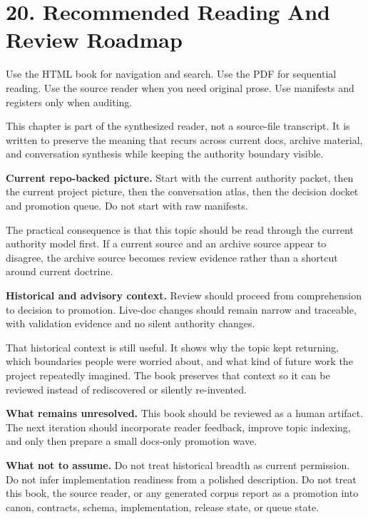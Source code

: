 \documentclass[10.5pt,a4paper,openany]{book}
\begin{document}
\section{20. Recommended Reading And Review Roadmap}

Use the HTML book for navigation and search.\allowbreak{} Use the PDF for sequential reading.\allowbreak{} Use the source reader when you need original prose.\allowbreak{} Use manifests and registers only when auditing.\allowbreak{}


This chapter is part of the synthesized reader, not a source-\allowbreak{}file transcript.\allowbreak{} It is written to preserve the meaning that recurs across current docs, archive material, and conversation synthesis while keeping the authority boundary visible.\allowbreak{}


\textbf{Current repo-backed picture.} Start with the current authority packet, then the current project picture, then the conversation atlas, then the decision docket and promotion queue.\allowbreak{} Do not start with raw manifests.\allowbreak{}


The practical consequence is that this topic should be read through the current authority model first.\allowbreak{} If a current source and an archive source appear to disagree, the archive source becomes review evidence rather than a shortcut around current doctrine.\allowbreak{}


\textbf{Historical and advisory context.} Review should proceed from comprehension to decision to promotion.\allowbreak{} Live-\allowbreak{}doc changes should remain narrow and traceable, with validation evidence and no silent authority changes.\allowbreak{}


That historical context is still useful.\allowbreak{} It shows why the topic kept returning, which boundaries people were worried about, and what kind of future work the project repeatedly imagined.\allowbreak{} The book preserves that context so it can be reviewed instead of rediscovered or silently re-\allowbreak{}invented.\allowbreak{}


\textbf{What remains unresolved.} This book should be reviewed as a human artifact.\allowbreak{} The next iteration should incorporate reader feedback, improve topic indexing, and only then prepare a small docs-\allowbreak{}only promotion wave.\allowbreak{}


\textbf{What not to assume.} Do not treat historical breadth as current permission.\allowbreak{} Do not infer implementation readiness from a polished description.\allowbreak{} Do not treat this book, the source reader, or any generated corpus report as a promotion into canon, contracts, schema, implementation, release state, or queue state.\allowbreak{}
\end{document}
